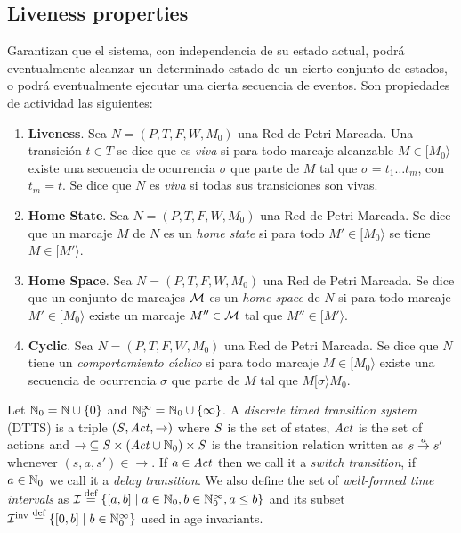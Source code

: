 
\subsection{Liveness properties}

Garantizan que el sistema, con independencia de su estado actual,
podr\'{a} eventualmente alcanzar un determinado estado de un cierto conjunto
de estados, o podr\'{a} eventualmente ejecutar una cierta secuencia de eventos.
Son propiedades de actividad las siguientes:
\begin{enumerate}
\item {\bf Liveness}.
Sea $N=(P,T,F,W,M_0)$ una Red de Petri Marcada. Una transici\'{o}n $t \in T$
se dice que es {\it viva} si para todo marcaje alcanzable $M \in
[ M_0 \rangle$ existe una secuencia de ocurrencia $\sigma$ que parte
de $M$ tal que $\sigma = t_1 \ldots t_m$, con $t_m = t$. Se dice que
$N$ es {\it viva} si todas sus transiciones son vivas.
\item {\bf Home State}.
Sea $N=(P,T,F,W,M_0)$ una Red de Petri Marcada. Se dice que
un marcaje $M$ de $N$ es un {\it home state} si para todo
$M' \in [ M_0 \rangle$ se tiene $M \in [ M' \rangle$.
\item {\bf Home Space}. Sea $N=(P,T,F,W,M_0)$ una Red de Petri Marcada.
Se dice que un conjunto de marcajes ${\cal M}$ es un {\it home-space}
de $N$ si para todo marcaje $M' \in [ M_0 \rangle$ existe un marcaje
$M'' \in {\cal M}$ tal que $M'' \in [ M' \rangle$.
\item {\bf Cyclic}.
Sea $N=(P,T,F,W,M_0)$ una Red de Petri Marcada. Se dice que
$N$ tiene un {\it comportamiento c\'{\i}clico} si para todo marcaje
$M \in [ M_0 \rangle$ existe una secuencia de ocurrencia $\sigma$
que parte de $M$ tal que $M [ \sigma \rangle M_0$.
\end{enumerate}


Let $\mathbb{N}_{0} = \mathbb{N} \cup \{0\}$ and 
$\mathbb{N}_{0}^{\infty} = \mathbb{N}_{0} \cup \left\{\infty \right\}$.
A \emph{discrete timed transition system} (DTTS) 
is a triple $\left(\mathit{S}, \mathit{Act},\rightarrow\right)$
where $\mathit{S}$ is the set of states, $\mathit{Act}$ is the set of actions
and $\rightarrow\: \subseteq \mathit{S} \times (\mathit{Act} \cup \mathbb{N}_{0})  \times \mathit{S}$ is the 
transition relation written as $s \stackrel{a}{\rightarrow} s'$ whenever $(s,a,s') \in \rightarrow$.
If $a \in \mathit{Act}$ then we call it a \emph{switch transition}, if
$a \in \mathbb{N}_{0}$ we call it a \emph{delay transition}.
We also define the set of \emph{well-formed time intervals} as 
$\mathcal{I} \stackrel{\textrm{def}}{=} \{[a,b] \mid a \in \mathbb{N}_{0},b\in \mathbb{N}_{0}^{\infty}, a\leq b \}$
and its subset $\mathcal{I}^{\text{inv}} \stackrel{\textrm{def}}{=} \{[0,b] \mid b\in \mathbb{N}_{0}^{\infty} \}$
used in age invariants. 

